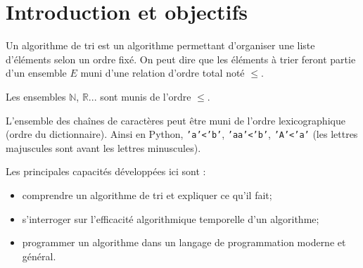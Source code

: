 



% 
%



\section{Introduction et objectifs}

\begin{obj}

Un algorithme de tri est un algorithme permettant d'organiser une liste d'éléments selon un ordre fixé.  On peut dire que les éléments à trier feront partie d'un ensemble $E$ muni d'une relation d'ordre total noté $\leq$.

Les ensembles $\mathbb{N}$, $\mathbb{R}$... sont munis de l'ordre $\leq$. 

L'ensemble des chaînes de caractères peut être muni de l'ordre lexicographique (ordre du dictionnaire). Ainsi en Python, \texttt{'a'<'b'}, \texttt{'aa'<'b'}, \texttt{'A'<'a'} (les lettres majuscules sont avant les lettres minuscules).

Les principales capacités développées ici sont :
\begin{itemize}
\item comprendre un algorithme de tri et expliquer ce qu'il fait;
\item s'interroger sur l'efficacité algorithmique temporelle d'un algorithme;
\item programmer un algorithme dans un langage de programmation moderne et général.
\end{itemize}

\end{obj}




